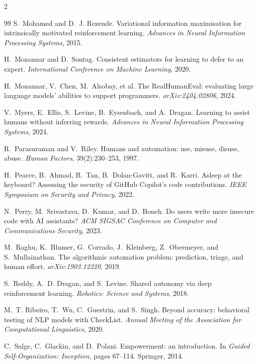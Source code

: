 \documentclass[10pt]{article}
\begin{document}
\begin{multicols}{2}
\begin{thebibliography}{99}
S.~Mohamed and D.~J. Rezende.
Variational information maximisation for intrinsically motivated reinforcement learning.
\emph{Advances in Neural Information Processing Systems}, 2015.

H.~Mozannar and D.~Sontag.
Consistent estimators for learning to defer to an expert.
\emph{International Conference on Machine Learning}, 2020.

H.~Mozannar, V.~Chen, M.~Alsobay, et al.
The RealHumanEval: evaluating large language models' abilities to support programmers.
\emph{arXiv:2404.02806}, 2024.

V.~Myers, E.~Ellis, S.~Levine, B.~Eysenbach, and A.~Dragan.
Learning to assist humans without inferring rewards.
\emph{Advances in Neural Information Processing Systems}, 2024.

R.~Parasuraman and V.~Riley.
Humans and automation: use, misuse, disuse, abuse.
\emph{Human Factors}, 39(2):230--253, 1997.

H.~Pearce, B.~Ahmad, B.~Tan, B.~Dolan-Gavitt, and R.~Karri.
Asleep at the keyboard? Assessing the security of GitHub Copilot's code contributions.
\emph{IEEE Symposium on Security and Privacy}, 2022.

N.~Perry, M.~Srivastava, D.~Kumar, and D.~Boneh.
Do users write more insecure code with AI assistants?
\emph{ACM SIGSAC Conference on Computer and Communications Security}, 2023.

M.~Raghu, K.~Blumer, G.~Corrado, J.~Kleinberg, Z.~Obermeyer, and S.~Mullainathan.
The algorithmic automation problem: prediction, triage, and human effort.
\emph{arXiv:1903.12220}, 2019.

S.~Reddy, A.~D. Dragan, and S.~Levine.
Shared autonomy via deep reinforcement learning.
\emph{Robotics: Science and Systems}, 2018.

M.~T. Ribeiro, T.~Wu, C.~Guestrin, and S.~Singh.
Beyond accuracy: behavioral testing of NLP models with CheckList.
\emph{Annual Meeting of the Association for Computational Linguistics}, 2020.

C.~Salge, C.~Glackin, and D.~Polani.
Empowerment: an introduction.
In \emph{Guided Self-Organization: Inception}, pages 67--114. Springer, 2014.


\end{thebibliography}
\end{multicols}
\end{document}
